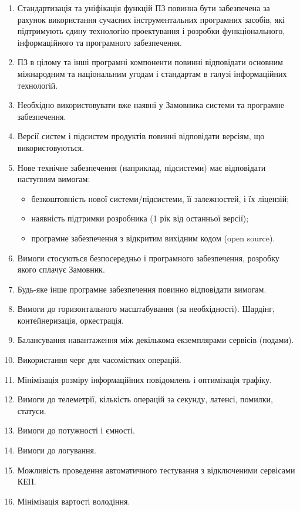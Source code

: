 \documentclass{article}
\begin{document}
\begin{enumerate}
  \item Стандартизація та уніфікація функцій ПЗ повинна бути забезпечена за рахунок використання сучасних інструментальних програмних засобів, які підтримують єдину технологію проектування і розробки функціонального, інформаційного та програмного забезпечення.
  \item ПЗ в цілому та інші програмні компоненти повинні відповідати основним міжнародним та національним угодам і стандартам в галузі інформаційних технологій.
  \item Необхідно використовувати вже наявні у Замовника системи та програмне забезпечення.
  \item Версії систем і підсистем продуктів повинні відповідати версіям, що використовуються.
  \item Нове технічне забезпечення (наприклад, підсистеми) має відповідати наступним вимогам:
    \begin{itemize}
      \item безкоштовність нової системи/підсистеми, її залежностей, і їх ліцензій;
      \item наявність підтримки розробника (1 рік від останньої версії);
      \item програмне забезпечення з відкритим вихідним кодом (open source).
    \end{itemize}
  \item Вимоги стосуються безпосередньо і програмного забезпечення, розробку якого сплачує Замовник.
  \item Будь-яке інше програмне забезпечення повинно відповідати вимогам.
  \item Вимоги до горизонтального масштабування (за необхідності). Шардінг, контейнеризація, оркестрація.
  \item Балансування навантаження між декількома екземплярами сервісів (подами).
  \item Використання черг для часомістких операцій.
  \item Мінімізація розміру інформаційних повідомлень і оптимізація трафіку.
  \item Вимоги до телеметрії, кількість операцій за секунду, латенсі, помилки, статуси.
  \item Вимоги до потужності і ємності.
  \item Вимоги до логування.
  \item Можливість проведення автоматичного тестування з відключеними сервісами КЕП.
  \item Мінімізація вартості володіння.
\end{enumerate}
\end{document}
